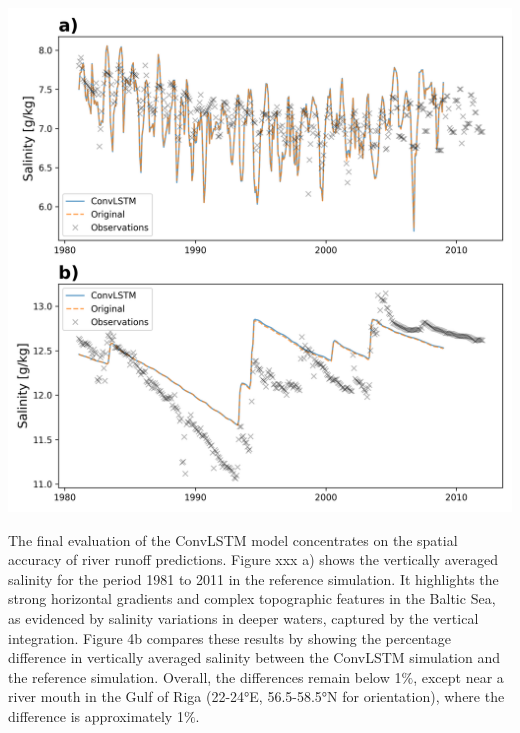 \documentclass[
]{agujournal2019}
\begin{document}
\includegraphics{../src/figures/by15_model.png}

The final evaluation of the ConvLSTM model concentrates on the spatial
accuracy of river runoff predictions. Figure xxx a) shows the vertically
averaged salinity for the period 1981 to 2011 in the reference
simulation. It highlights the strong horizontal gradients and complex
topographic features in the Baltic Sea, as evidenced by salinity
variations in deeper waters, captured by the vertical integration.
Figure 4b compares these results by showing the percentage difference in
vertically averaged salinity between the ConvLSTM simulation and the
reference simulation. Overall, the differences remain below 1\(\%\),
except near a river mouth in the Gulf of Riga (22-24°E, 56.5-58.5°N for
orientation), where the difference is approximately 1\(\%\).
\end{document}
